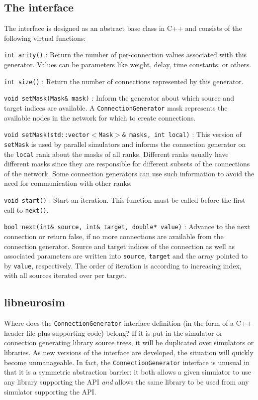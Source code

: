 \documentclass{frontiersSCNS} %
\begin{document}
\subsection{The interface}\label{sec:cgint}

The interface is designed as an abstract base class in C++ and
consists of the following virtual functions:

\begin{unlist}
\item[\tt int arity()]: Return the number of per-connection values
  associated with this generator. Values can be parameters like
  weight, delay, time constants, or others.
\item[\tt int size()]: Return the number of connections represented by
  this generator.
\item[\tt void setMask(Mask\& mask)]: Inform the generator about which
  source and target indices are available. A
  \verb|ConnectionGenerator| mask represents the available nodes in
  the network for which to create connections.
\item[\tt void setMask(std::vector$<$Mask$>$\& masks, int local)]:
  This version of \texttt{setMask} is used by parallel simulators and
  informs the connection generator on the \verb|local| rank about the
  masks of all ranks. Different ranks usually have different masks
  since they are responsible for different subsets of the connections
  of the network. Some connection generators can use such information
  to avoid the need for communication with other ranks.
\item[\tt void start()]: Start an iteration. This function must be called
  before the first call to \verb|next()|.
\item[\tt bool next(int\& source, int\& target, double* value)]:
  Advance to the next connection or return false, if no more
  connections are available from the connection generator. Source and
  target indices of the connection as well as associated parameters
  are written into \verb|source|, \verb|target| and the array pointed
  to by \verb|value|, respectively. The order of iteration is
  according to increasing index, with all sources iterated over per
  target.
\end{unlist}

\subsection{libneurosim}\label{sec:libneurosim}
Where does the \verb|ConnectionGenerator| interface definition (in the
form of a C++ header file plus supporting code) belong?  If it is put
in the simulator or connection generating library source trees, it
will be duplicated over simulators or libraries.  As new versions of
the interface are developed, the situation will quickly become
unmanageable.  In fact, the \verb|ConnectionGenerator| interface is
unusual in that it is a symmetric abstraction barrier: it both allows
a given simulator to use any library supporting the API \emph{and}
allows the same library to be used from any simulator supporting the
API.
\end{document}
